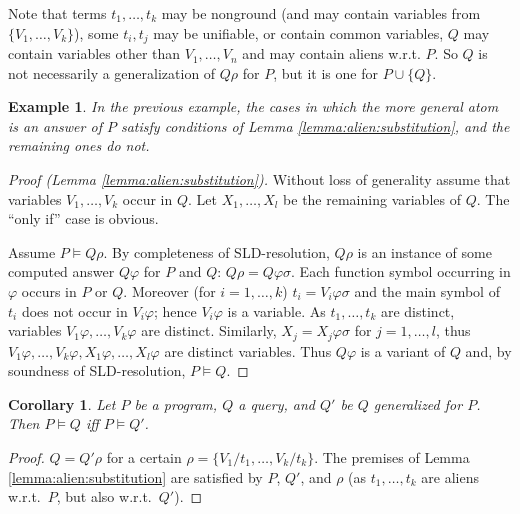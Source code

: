 \documentclass[a4paper]{tlp2}
\newtheorem{corollary}[theorem]{Corollary}
\newtheorem{example}[theorem]{Example}
\newcommand*{\seq}[2][n]  {{#2_{1}, \allowbreak \ldots, \allowbreak #2_{#1}}}
\begin{document}
Note that terms $\seq[k]t$ may be nonground 
(and may contain variables from $\{\seq[k]V\}$), some
$t_i,t_j$ may be unifiable, or contain common variables,
$Q$ may contain variables other than $\seq V$
and may contain aliens w.r.t. $P$.
So $Q$ is not necessarily a generalization of $Q\rho$ for $P$,
but it is one for $P\cup\{Q\}$.


\begin{example}
In the previous example, the cases in which the more general atom is an
answer of $P$ satisfy conditions of Lemma \ref{lemma:alien:substitution},
and the remaining ones do not.

\end{example}

\begin{proof}[Proof (Lemma \ref{lemma:alien:substitution})]


Without loss of generality assume that variables $\seq[k]V$ occur in $Q$.
Let  $\seq[l]X$ be the remaining variables of $Q$.
The ``only if'' case is obvious.

Assume $P\models Q\rho$.  
By completeness of SLD-resolution,
$Q\rho$ is an instance of some computed answer $Q\varphi$ for $P$ and $Q$:
$Q\rho=Q\varphi\sigma$.
Each function symbol occurring in $\varphi$ occurs in $P$ or $Q$.
Moreover (for $i=1,\ldots,k$) $t_i=V_i\varphi\sigma$
and the main symbol of $t_i$ does not occur in $V_i\varphi$;
hence $V_i\varphi$ is a variable.
As $\seq[k] t$ are distinct, variables $V_1\varphi,\ldots,V_k\varphi$ are
distinct. 
  Similarly,  $X_j=X_j\varphi\sigma$ for $j=1,\ldots,l$, thus
$V_1\varphi,\ldots,V_k\varphi,X_1\varphi,\ldots,X_l\varphi$ 
  are distinct variables.
Thus $Q\varphi$ is a variant of $Q$ and, by soundness of
  SLD-resolution, $P\models Q$.
\end{proof}





\begin{corollary}
\label{th:generalized}
\label{cor:generalized}
Let $P$ be a program, $Q$ a query, and $Q'$ be $Q$ generalized for $P$.
Then $P\models Q$ iff  $P\models Q'$.
\end{corollary}

\begin{proof}
$Q=Q'\rho$ for a certain  $\rho=\{V_1/t_1,\ldots,V_k/t_k\}$.
The premises of Lemma \ref{lemma:alien:substitution}  
are satisfied by $P$, $Q'$, and $\rho$
(as $\seq[k]t$ are aliens w.r.t.\ $P$, but also w.r.t.\ $Q'$).
\end{proof}
\end{document}
